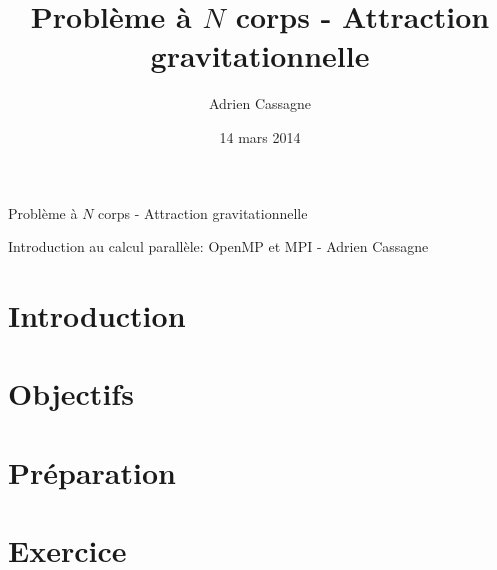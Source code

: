 \documentclass[a4paper,11pt,answers,11pt]{exam}
\title{Problème à $N$ corps - Attraction gravitationnelle}
\author{Adrien Cassagne}
\date{14 mars 2014}
\begin{document}
\begin{title}
\noindent{}
\begin{center}
	{\Large{Problème à $N$ corps - Attraction gravitationnelle}}\\
\end{center}
\begin{center}
	{\footnotesize{Introduction au calcul parallèle: OpenMP et MPI - Adrien {\sc Cassagne}}}
\end{center}
\end{title}

\setcounter{page}{1}
\section {Introduction}


\section {Objectifs}


\section {Préparation}


\section {Exercice}

\end{document}
